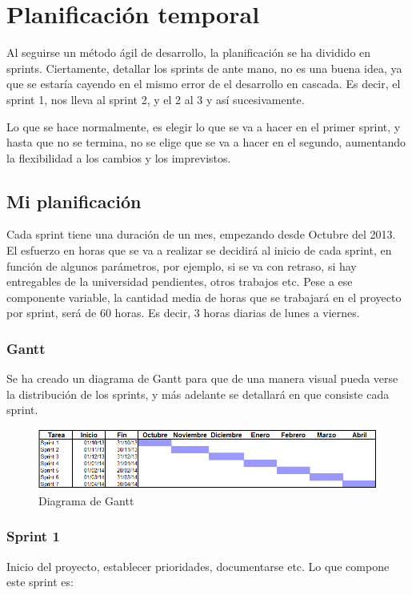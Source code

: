\section{Planificaci\'{o}n temporal}
Al seguirse un m\'etodo \'agil de desarrollo, la planificaci\'on se ha
dividido en sprints. Ciertamente, detallar los sprints de ante mano,
no es una buena idea, ya que se estar\'ia cayendo en el mismo error de el desarrollo
en cascada. Es decir, el sprint 1, nos lleva al sprint 2, y el 2 al 3 y as\'i sucesivamente.

Lo que se hace normalmente, es elegir lo que se va a hacer en el primer sprint, y hasta
que no se termina, no se elige que se va a hacer en el segundo, aumentando la flexibilidad a 
los cambios y los imprevistos.

\subsection{Mi planificaci\'{o}n}
Cada sprint tiene una duraci\'{o}n de un mes, empezando desde Octubre del 2013. 
El esfuerzo en horas que se va a 
realizar se decidir\'a al inicio de cada sprint, en funci\'on de algunos par\'ametros, por ejemplo, si se va con retraso,
si hay entregables de la universidad pendientes, otros trabajos etc. Pese a ese componente variable, la cantidad
media de horas que se trabajar\'a en el proyecto por sprint, ser\'a de 60 horas. Es decir, 3 horas diarias de lunes a viernes.

\subsubsection{Gantt}
Se ha creado un diagrama de Gantt para que de una manera visual pueda
verse la distribuci\'on de los sprints, y m\'as adelante se detallar\'a
en que consiste cada sprint.

\begin{figure}[h]
\centering
\includegraphics[width=0.9\linewidth]{./Figures/Gantt.PNG}
\caption[Diagrama de Gantt]{Diagrama de Gantt}
\label{fig:Gantt}
\end{figure}

\subsubsection{Sprint 1}
Inicio del proyecto, establecer prioridades, documentarse etc. Lo que compone este sprint es:

